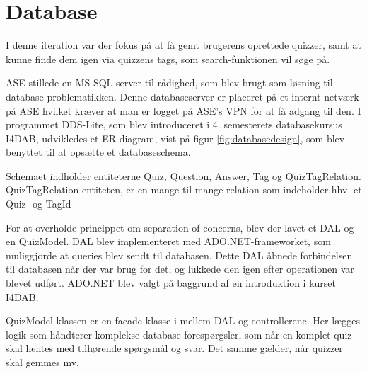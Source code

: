 \section{Database}
I denne iteration var der fokus på at få gemt brugerens oprettede quizzer, samt at kunne finde dem igen via quizzens tags, som search-funktionen vil søge på.

ASE stillede en MS SQL server \citep{sqlserverWeb} til rådighed, som blev brugt som løsning til database problematikken. Denne databaseserver er placeret på et internt netværk på ASE hvilket kræver at man er logget på ASE's VPN for at få adgang til den. I programmet DDS-Lite, som blev introduceret i 4. semesterets databasekursus I4DAB, udvikledes et ER-diagram, vist på figur \ref{fig:databasedesign}, som blev benyttet til at opsætte et databaseschema.

Schemaet indholder entiteterne Quiz, Question, Answer, Tag og QuizTagRelation. QuizTagRelation entiteten, er en mange-til-mange relation som indeholder hhv. et Quiz- og TagId


For at overholde princippet om separation of concerns, blev der lavet et DAL og en QuizModel. DAL blev implementeret med ADO.NET-frameworket, som muliggjorde at queries blev sendt til databasen. Dette DAL åbnede forbindelsen til databasen når der var brug for det, og lukkede den igen efter operationen var blevet udført. ADO.NET blev valgt på baggrund af en introduktion i kurset I4DAB. 

QuizModel-klassen er en facade-klasse i mellem DAL og controllerene. Her lægges logik som håndterer komplekse database-forespørgsler, som når en komplet quiz skal hentes med tilhørende spørgsmål og svar. Det samme gælder, når quizzer skal gemmes mv.
